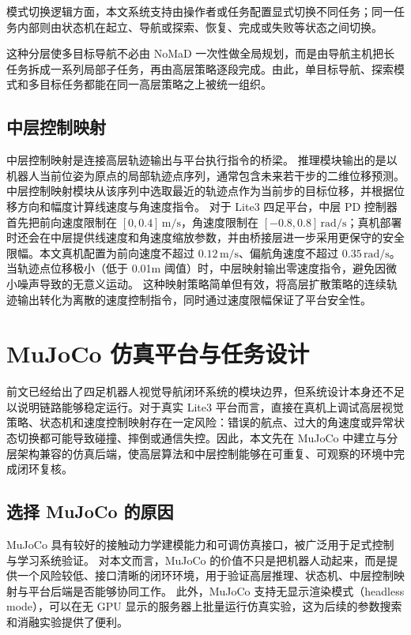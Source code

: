 模式切换逻辑方面，本文系统支持由操作者或任务配置显式切换不同任务；同一任务内部则由状态机在起立、导航或探索、恢复、完成或失败等状态之间切换。

这种分层使多目标导航不必由 NoMaD 一次性做全局规划，而是由导航主机把长任务拆成一系列局部子任务，再由高层策略逐段完成。由此，单目标导航、探索模式和多目标任务都能在同一高层策略之上被统一组织。

\subsection{中层控制映射}

中层控制映射是连接高层轨迹输出与平台执行指令的桥梁。
推理模块输出的是以机器人当前位姿为原点的局部轨迹点序列，通常包含未来若干步的二维位移预测。
中层控制映射模块从该序列中选取最近的轨迹点作为当前步的目标位移，并根据位移方向和幅度计算线速度与角速度指令。
对于 Lite3 四足平台，中层 PD 控制器首先把前向速度限制在 $[0,0.4]\,\mathrm{m/s}$，角速度限制在 $[-0.8,0.8]\,\mathrm{rad/s}$；真机部署时还会在中层提供线速度和角速度缩放参数，并由桥接层进一步采用更保守的安全限幅。本文真机配置为前向速度不超过 $0.12\,\mathrm{m/s}$、偏航角速度不超过 $0.35\,\mathrm{rad/s}$。
当轨迹点位移极小（低于 0.01m 阈值）时，中层映射输出零速度指令，避免因微小噪声导致的无意义运动。
这种映射策略简单但有效，将高层扩散策略的连续轨迹输出转化为离散的速度控制指令，同时通过速度限幅保证了平台安全性。

\section{MuJoCo 仿真平台与任务设计}\label{sec:mujoco-platform}

前文已经给出了四足机器人视觉导航闭环系统的模块边界，但系统设计本身还不足以说明链路能够稳定运行。对于真实 Lite3 平台而言，直接在真机上调试高层视觉策略、状态机和速度控制映射存在一定风险：错误的航点、过大的角速度或异常状态切换都可能导致碰撞、摔倒或通信失控。因此，本文先在 MuJoCo 中建立与分层架构兼容的仿真后端，使高层算法和中层控制能够在可重复、可观察的环境中完成闭环复核。

\subsection{选择 MuJoCo 的原因}

MuJoCo 具有较好的接触动力学建模能力和可调仿真接口，被广泛用于足式控制与学习系统验证\cite{mujoco2012,hwangbo2019anymal,rl_locomotion_rudin2022}。
对本文而言，MuJoCo 的价值不只是把机器人动起来，而是提供一个风险较低、接口清晰的闭环环境，用于验证高层推理、状态机、中层控制映射与平台后端是否能够协同工作。
此外，MuJoCo 支持无显示渲染模式（headless mode），可以在无 GPU 显示的服务器上批量运行仿真实验，这为后续的参数搜索和消融实验提供了便利。

